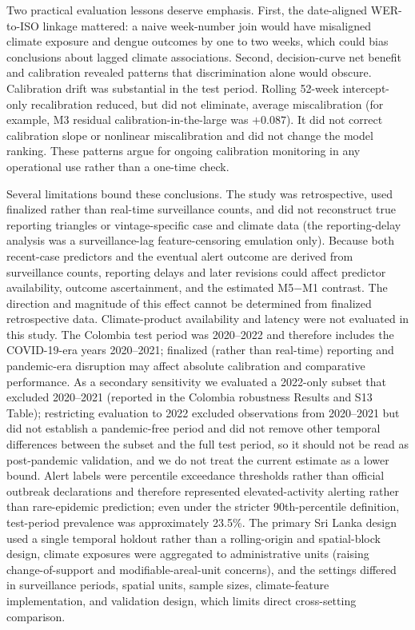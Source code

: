 \documentclass[11pt,a4paper]{article}
\begin{document}
Two practical evaluation lessons deserve emphasis. First, the date-aligned WER-to-ISO linkage mattered: a naive week-number join would have misaligned climate exposure and dengue outcomes by one to two weeks, which could bias conclusions about lagged climate associations. Second, decision-curve net benefit and calibration revealed patterns that discrimination alone would obscure. Calibration drift was substantial in the test period. Rolling 52-week intercept-only recalibration reduced, but did not eliminate, average miscalibration (for example, M3 residual calibration-in-the-large was $+0.087$). It did not correct calibration slope or nonlinear miscalibration and did not change the model ranking. These patterns argue for ongoing calibration monitoring in any operational use rather than a one-time check.

Several limitations bound these conclusions. The study was retrospective, used finalized rather than real-time surveillance counts, and did not reconstruct true reporting triangles or vintage-specific case and climate data (the reporting-delay analysis was a surveillance-lag feature-censoring emulation only). Because both recent-case predictors and the eventual alert outcome are derived from surveillance counts, reporting delays and later revisions could affect predictor availability, outcome ascertainment, and the estimated M5$-$M1 contrast. The direction and magnitude of this effect cannot be determined from finalized retrospective data. Climate-product availability and latency were not evaluated in this study. The Colombia test period was 2020--2022 and therefore includes the COVID-19-era years 2020--2021; finalized (rather than real-time) reporting and pandemic-era disruption may affect absolute calibration and comparative performance. As a secondary sensitivity we evaluated a 2022-only subset that excluded 2020--2021 (reported in the Colombia robustness Results and S13 Table); restricting evaluation to 2022 excluded observations from 2020--2021 but did not establish a pandemic-free period and did not remove other temporal differences between the subset and the full test period, so it should not be read as post-pandemic validation, and we do not treat the current estimate as a lower bound. Alert labels were percentile exceedance thresholds rather than official outbreak declarations and therefore represented elevated-activity alerting rather than rare-epidemic prediction; even under the stricter 90th-percentile definition, test-period prevalence was approximately 23.5\%. The primary Sri Lanka design used a single temporal holdout rather than a rolling-origin and spatial-block design, climate exposures were aggregated to administrative units (raising change-of-support and modifiable-areal-unit concerns), and the settings differed in surveillance periods, spatial units, sample sizes, climate-feature implementation, and validation design, which limits direct cross-setting comparison. 
\end{document}
